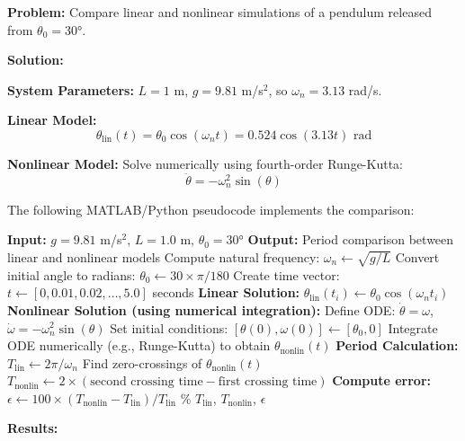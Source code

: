 \textbf{Problem:} Compare linear and nonlinear simulations of a pendulum released from $\theta_0 = 30°$.

\textbf{Solution:}

\textbf{System Parameters:} $L = 1$ m, $g = 9.81$ m/s$^2$, so $\omega_n = 3.13$ rad/s.

\textbf{Linear Model:}
\begin{equation}
\theta_{\text{lin}}(t) = \theta_0 \cos(\omega_n t) = 0.524 \cos(3.13t) \text{ rad}
\end{equation}

\textbf{Nonlinear Model:} Solve numerically using fourth-order Runge-Kutta:
\begin{equation}
\ddot{\theta} = -\omega_n^2 \sin(\theta)
\end{equation}

The following MATLAB/Python pseudocode implements the comparison:

\begin{algorithm}
\caption{Nonlinear Pendulum Simulation and Comparison}
\begin{algorithmic}[1]
\State \textbf{Input:} $g = 9.81$ m/s$^2$, $L = 1.0$ m, $\theta_0 = 30°$
\State \textbf{Output:} Period comparison between linear and nonlinear models
\State
\State Compute natural frequency: $\omega_n \gets \sqrt{g/L}$
\State Convert initial angle to radians: $\theta_0 \gets 30 \times \pi/180$
\State Create time vector: $t \gets [0, 0.01, 0.02, \ldots, 5.0]$ seconds
\State
\State \textbf{Linear Solution:}
    \State $\theta_{\text{lin}}(t_i) \gets \theta_0 \cos(\omega_n t_i)$
\EndFor
\State
\State \textbf{Nonlinear Solution (using numerical integration):}
\State Define ODE: $\dot{\theta} = \omega$, $\dot{\omega} = -\omega_n^2 \sin(\theta)$
\State Set initial conditions: $[\theta(0), \omega(0)] \gets [\theta_0, 0]$
\State Integrate ODE numerically (e.g., Runge-Kutta) to obtain $\theta_{\text{nonlin}}(t)$
\State
\State \textbf{Period Calculation:}
\State $T_{\text{lin}} \gets 2\pi / \omega_n$
\State Find zero-crossings of $\theta_{\text{nonlin}}(t)$
\State $T_{\text{nonlin}} \gets 2 \times (\text{second crossing time} - \text{first crossing time})$
\State
\State \textbf{Compute error:} $\epsilon \gets 100 \times (T_{\text{nonlin}} - T_{\text{lin}}) / T_{\text{lin}}$ \%
\Return $T_{\text{lin}}$, $T_{\text{nonlin}}$, $\epsilon$
\end{algorithmic}
\end{algorithm}

\textbf{Results:}

